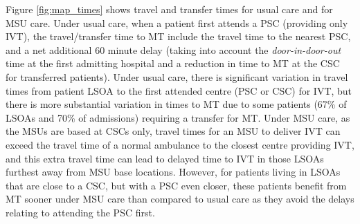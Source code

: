 Figure \ref{fig:map_times} shows travel and transfer times for usual care and for MSU care. Under usual care, when a patient first attends a PSC (providing only IVT), the travel/transfer time to MT include the travel time to the nearest PSC, and a net additional 60 minute delay (taking into account the \textit{door-in-door-out} time at the first admitting hospital and a reduction in time to MT at the CSC for transferred patients). Under usual care, there is significant variation in travel times from patient LSOA to the first attended centre (PSC or CSC) for IVT, but there is more substantial variation in times to MT due to some patients (67\% of LSOAs and 70\% of admissions) requiring a transfer for MT. Under MSU care, as the MSUs are based at CSCs only, travel times for an MSU to deliver IVT can exceed the travel time of a normal ambulance to the closest centre providing IVT, and this extra travel time can lead to delayed time to IVT in those LSOAs furthest away from MSU base locations. However, for patients living in LSOAs that are close to a CSC, but with a PSC even closer, these patients benefit from MT sooner under MSU care than compared to usual care as they avoid the delays relating to attending the PSC first.

